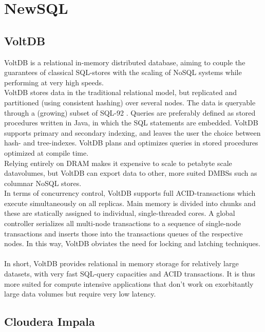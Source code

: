 \documentclass{IEEEtran}
\begin{document}
\section{NewSQL}
\subsection{VoltDB}

VoltDB is a relational in-memory distributed database, aiming to couple the guarantees of classical SQL-stores with the scaling of NoSQL systems while performing at very high speeds\cite{stonebraker2013voltdb}.
\\VoltDB stores data in the traditional relational model, but replicated and partitioned (using consistent hashing) over several nodes\cite{grolinger2013data}. The data is queryable through a (growing) subset of SQL-92 \cite{voltdb2010voltdb}. Queries are preferably defined as stored procedures written in Java, in which the SQL statements are embedded. VoltDB supports primary and secondary indexing, and leaves the user the choice between hash- and tree-indexes\cite{voltdb_indexes}. VoltDB plans and optimizes queries in stored procedures optimized at compile time\cite{voltdb_query_plans}.\\
Relying entirely on DRAM makes it expensive to scale to petabyte scale datavolumes, but VoltDB can export data to other, more suited DMBSs such as columnar NoSQL stores.
\\In terms of concurrency control, VoltDB supports full ACID-transactions which execute simultaneously on all replicas. Main memory is divided into chunks and these are statically assigned to individual, single-threaded cores. A global controller serializes all multi-node transactions to a sequence of single-node transactions and inserts those into the transactions queues of the respective nodes. In this way, VoltDB obviates the need for locking and latching techniques.
\\\\
In short, VoltDB provides relational in memory storage for relatively large datasets, with very fast SQL-query capacities and ACID transactions. It is thus more suited for compute intensive applications that don't work on exorbitantly large data volumes but require very low latency.

\subsection{Cloudera Impala}
\end{document}
